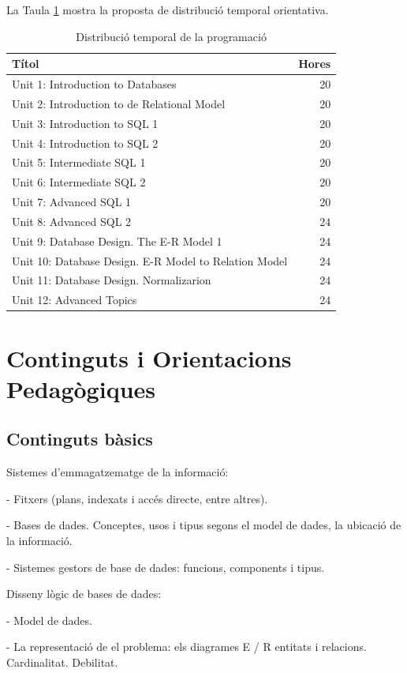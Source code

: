 \documentclass[catalan, a4paper, 12pt, titlepage]{article}
\begin{document}
La Taula \ref{tab:distribuciotemporal} mostra la proposta de distribució temporal orientativa.

\begin{table}
	\centering
\begin{tabular}{lr}
 Títol & Hores\\
 \hline
 Unit 1: Introduction to Databases & 20\\
 Unit 2: Introduction to de Relational Model & 20  \\
 Unit 3: Introduction to SQL 1 & 20\\
 Unit 4: Introduction to SQL 2 & 20 \\
 Unit 5: Intermediate SQL 1 & 20 \\
 Unit 6: Intermediate SQL 2 & 20 \\
 Unit 7: Advanced SQL 1 & 20 \\
 Unit 8: Advanced SQL 2 & 24\\
 Unit 9: Database Design. The E-R Model 1 & 24\\
 Unit 10: Database Design. E-R Model to Relation Model & 24 \\
 Unit 11: Database Design. Normalizarion & 24 \\
 Unit 12: Advanced Topics & 24 \\
\end{tabular}
	\caption{Distribució temporal de la programació} \label{tab:distribuciotemporal}
\end{table}

\section{Continguts i Orientacions Pedagògiques}

\subsection{Continguts bàsics}

Sistemes d'emmagatzematge de la informació:

- Fitxers (plans, indexats i accés directe, entre altres).

- Bases de dades. Conceptes, usos i tipus segons el model de dades, la ubicació de la informació.

- Sistemes gestors de base de dades: funcions, components i tipus.

Disseny lògic de bases de dades:

- Model de dades.

- La representació de el problema: els diagrames E / R entitats i relacions. Cardinalitat. Debilitat.
\end{document}

